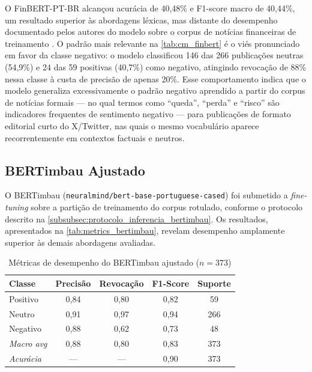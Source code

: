 O FinBERT-PT-BR alcançou acurácia de 40,48\% e F1-score macro de 40,44\%, um resultado superior às abordagens léxicas, mas distante do desempenho documentado pelos autores do modelo sobre o corpus de notícias financeiras de treinamento \cite{santos2023finbert}. O padrão mais relevante na \autoref{tab:cm_finbert} é o viés pronunciado em favor da classe negativo: o modelo classificou 146 das 266 publicações neutras (54,9\%) e 24 das 59 positivas (40,7\%) como negativo, atingindo revocação de 88\% nessa classe à custa de precisão de apenas 20\%. Esse comportamento indica que o modelo generaliza excessivamente o padrão negativo aprendido a partir do corpus de notícias formais --- no qual termos como ``queda'', ``perda'' e ``risco'' são indicadores frequentes de sentimento negativo --- para publicações de formato editorial curto do X/Twitter, nas quais o mesmo vocabulário aparece recorrentemente em contextos factuais e neutros.


\subsection{BERTimbau Ajustado}
\label{subsec:res_bertimbau}

O BERTimbau (\texttt{neuralmind/bert-base-portuguese-cased}) \cite{souza2020} foi submetido a \textit{fine-tuning} sobre a partição de treinamento do corpus rotulado, conforme o protocolo descrito na \autoref{subsubsec:protocolo_inferencia_bertimbau}. Os resultados, apresentados na \autoref{tab:metrics_bertimbau}, revelam desempenho amplamente superior às demais abordagens avaliadas.

\begin{table}[!htbp]
	\caption[Métricas de desempenho — BERTimbau ajustado]{Métricas de desempenho do BERTimbau ajustado ($n = 373$)}
	\label{tab:metrics_bertimbau}
	\centering
	\begin{tabular}{lcccc}
		\hline
		\textbf{Classe}    & \textbf{Precisão} & \textbf{Revocação} & \textbf{F1-Score} & \textbf{Suporte} \\
		\hline
		Positivo           & 0,84              & 0,80               & 0,82              & 59  \\
		\hline
		Neutro             & 0,91              & 0,97               & 0,94              & 266 \\
		\hline
		Negativo           & 0,88              & 0,62               & 0,73              & 48  \\
		\hline
		\textit{Macro avg} & 0,88              & 0,80               & 0,83              & 373 \\
		\hline
		\textit{Acurácia}  & ---               & ---                & 0,90              & 373 \\
		\hline
	\end{tabular}
\end{table}


